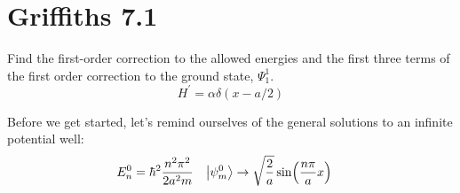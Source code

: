 \documentclass[11pt]{article}
\begin{document}
 
\newpage 

\section*{Griffiths 7.1}
Find the first-order correction to the allowed energies and the first three terms of the first order correction to the ground state, $\Psi_1^1$.
\[H^\prime = \alpha \delta(x - a/2)\]

Before we get started, let's remind ourselves of the general solutions to an infinite potential well:
\begin{align*}
E_n^0 & = \hbar^2 \frac{n^2 \pi^2}{2a^2 m} & \ket{\psi^0_m} & \rightarrow \sqrt{\frac{2}{a}}\sin(\frac{n \pi}{a}x)
\end{align*}
\end{document}
